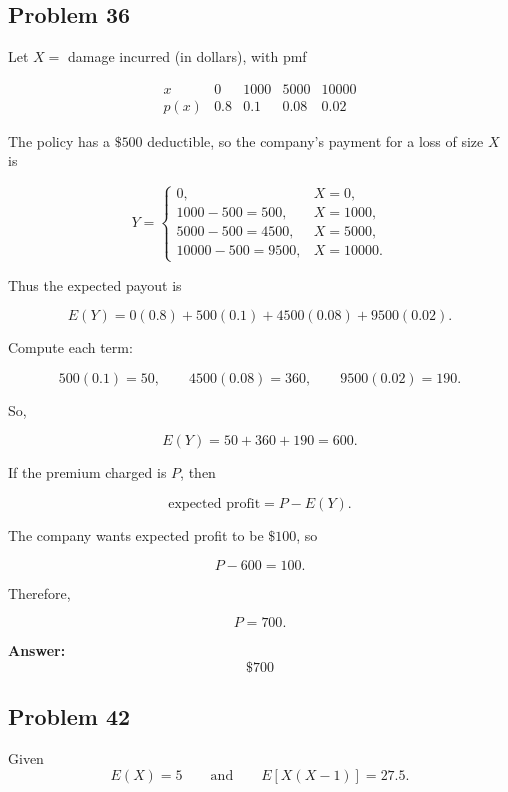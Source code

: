 \documentclass[11pt]{article}
\begin{document}
\subsection*{Problem 36}

Let \(X=\) damage incurred (in dollars), with pmf

\[
\begin{array}{c|cccc}
x & 0 & 1000 & 5000 & 10000 \\ \hline
p(x) & 0.8 & 0.1 & 0.08 & 0.02
\end{array}
\]

The policy has a \(\$500\) deductible, so the company's payment for a loss of size \(X\) is

\[
Y=
\begin{cases}
0, & X=0,\\
1000-500=500, & X=1000,\\
5000-500=4500, & X=5000,\\
10000-500=9500, & X=10000.
\end{cases}
\]

Thus the expected payout is

\[
E(Y)=0(0.8)+500(0.1)+4500(0.08)+9500(0.02).
\]

Compute each term:

\[
500(0.1)=50,\qquad 4500(0.08)=360,\qquad 9500(0.02)=190.
\]

So,

\[
E(Y)=50+360+190=600.
\]

If the premium charged is \(P\), then

\[
\text{expected profit}=P-E(Y).
\]

The company wants expected profit to be \(\$100\), so

\[
P-600=100.
\]

Therefore,

\[
P=700.
\]

\textbf{Answer:}
\[
\boxed{\$700}
\]

\subsection*{Problem 42}

Given
\[
E(X)=5
\qquad \text{and} \qquad
E[X(X-1)]=27.5.
\]
\end{document}
